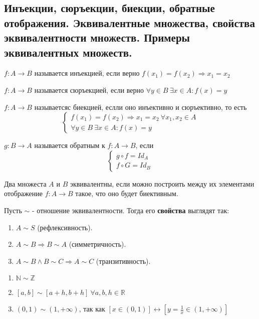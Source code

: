 \documentclass{article}
\begin{document}
\subsection{Инъекции, сюръекции, биекции, обратные отображения. Эквивалентные множества, свойства эквивалентности множеств. Примеры эквивалентных множеств.}
 $f: A \to B$ называется инъекцией, если верно $f(x_1) = f(x_2) \Rightarrow x_1 = x_2$

 $f: A \to B$ называется сюръекцией, если верно $\forall y \in B\  \exists x \in A : f(x) = y$

 $f: A \to B$ называетсяс биекцией, еслли оно инъективно и сюръективно, то есть
\begin{equation*}
	\begin{cases}
		f(x_1) = f(x_2) \Rightarrow x_1 = x_2 \ \forall x_1,x_2 \in A\\
		\forall y \in B \ \exists x \in A : f(x) = y
	\end{cases}
\end{equation*} 


 $g: B \to A$ называется обратным к $f: A \to B$, если
\begin{equation*}
	\begin{cases}
		g \circ f = Id_A \\
		f \circ G = Id_B
	\end{cases}
\end{equation*}

 Два множеста $A$ и $B$ эквивалентны, если можно построить между их элементами отображение $f: A \to B$ такое, что оно будет биективным.

\noindent Пусть $\sim$ - отношение эквивалентности. Тогда его {\bf свойства} выглядят так:
\begin{enumerate}
	\item $A \sim S$ (рефлексивность).
	\item $A \sim B \Rightarrow B \sim A$ (симметричность).
	\item $A \sim B \wedge B \sim C \Rightarrow A \sim C$ (транзитивность).
\end{enumerate}

\begin{enumerate}
	\item $\mathbb{N} \sim \mathbb{Z}$
	\item $[a, b] \sim [a + h,b + h] \ \forall a, b, h \in \mathbb{R}$
	\item $(0, 1) \sim (1, +\infty)$, так как $[x \in (0, 1)] \leftrightarrow [ y = \displaystyle\frac{1}{x} \in (1, +\infty)]$
\end{enumerate}
\end{document}

